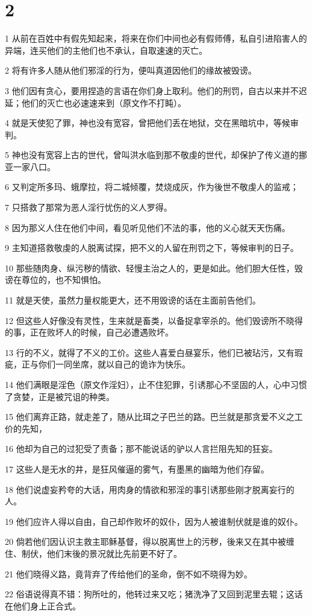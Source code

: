 \chapter{2}

\par 1 从前在百姓中有假先知起来，将来在你们中间也必有假师傅，私自引进陷害人的异端，连买他们的主他们也不承认，自取速速的灭亡。
\par 2 将有许多人随从他们邪淫的行为，便叫真道因他们的缘故被毁谤。
\par 3 他们因有贪心，要用捏造的言语在你们身上取利。他们的刑罚，自古以来并不迟延；他们的灭亡也必速速来到（原文作不打盹）。
\par 4 就是天使犯了罪，神也没有宽容，曾把他们丢在地狱，交在黑暗坑中，等候审判。
\par 5 神也没有宽容上古的世代，曾叫洪水临到那不敬虔的世代，却保护了传义道的挪亚一家八口。
\par 6 又判定所多玛、蛾摩拉，将二城倾覆，焚烧成灰，作为後世不敬虔人的监戒；
\par 7 只搭救了那常为恶人淫行忧伤的义人罗得。
\par 8 因为那义人住在他们中间，看见听见他们不法的事，他的义心就天天伤痛。
\par 9 主知道搭救敬虔的人脱离试探，把不义的人留在刑罚之下，等候审判的日子。
\par 10 那些随肉身、纵污秽的情欲、轻慢主治之人的，更是如此。他们胆大任性，毁谤在尊位的，也不知惧怕。
\par 11 就是天使，虽然力量权能更大，还不用毁谤的话在主面前告他们。
\par 12 但这些人好像没有灵性，生来就是畜类，以备捉拿宰杀的。他们毁谤所不晓得的事，正在败坏人的时候，自己必遭遇败坏。
\par 13 行的不义，就得了不义的工价。这些人喜爱白昼宴乐，他们已被玷污，又有瑕疵，正与你们一同坐席，就以自己的诡诈为快乐。
\par 14 他们满眼是淫色（原文作淫妇），止不住犯罪，引诱那心不坚固的人，心中习惯了贪婪，正是被咒诅的种类。
\par 15 他们离弃正路，就走差了，随从比珥之子巴兰的路。巴兰就是那贪爱不义之工价的先知，
\par 16 他却为自己的过犯受了责备；那不能说话的驴以人言拦阻先知的狂妄。
\par 17 这些人是无水的井，是狂风催逼的雾气，有墨黑的幽暗为他们存留。
\par 18 他们说虚妄矜夸的大话，用肉身的情欲和邪淫的事引诱那些刚才脱离妄行的人。
\par 19 他们应许人得以自由，自己却作败坏的奴仆，因为人被谁制伏就是谁的奴仆。
\par 20 倘若他们因认识主救主耶稣基督，得以脱离世上的污秽，後来又在其中被缠住、制伏，他们末後的景况就比先前更不好了。
\par 21 他们晓得义路，竟背弃了传给他们的圣命，倒不如不晓得为妙。
\par 22 俗语说得真不错：狗所吐的，他转过来又吃；猪洗净了又回到泥里去辊；这话在他们身上正合式。

